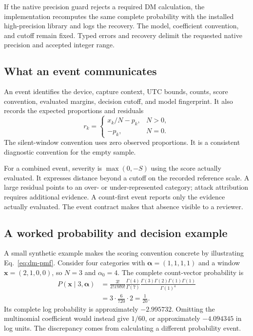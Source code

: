 If the native precision guard rejects a required DM calculation, the
implementation recomputes the same complete probability with the installed
high-precision library and logs the recovery. The model, coefficient
convention, and cutoff remain fixed. Typed errors and recovery delimit the
requested native precision and accepted integer range.

\subsection{What an event communicates}

An event identifies the device, capture context, UTC bounds, counts,
score convention, evaluated margins, decision cutoff, and model
fingerprint. It also records the expected proportions and residuals
\[
 r_k=\begin{cases}x_k/N-p_k,&N>0,\\-p_k,&N=0.\end{cases}
\]
The silent-window convention uses zero observed proportions. It is a
consistent diagnostic convention for the empty sample.

For a combined event, severity is $\max(0,-S)$ using the score actually
evaluated. It expresses distance beyond a cutoff on the recorded reference
scale. A large residual points to an over- or under-represented category;
attack attribution requires additional evidence. A count-first event
reports only the evidence actually evaluated. The event contract makes
that absence visible to a reviewer.

\subsection{A worked probability and decision example}
\label{sec:worked-score}

A small synthetic example makes the scoring convention concrete by
illustrating Eq.~\eqref{eq:dm-pmf}. Consider four categories
with $\boldsymbol{\alpha}=(1,1,1,1)$ and a window
$\boldsymbol{x}=(2,1,0,0)$, so $N=3$ and $\alpha_0=4$.
The complete count-vector probability is
\begin{align*}
 P(\boldsymbol{x}\mid3,\boldsymbol{\alpha})
 &=\frac{3!}{2!1!0!0!}
   \frac{\Gamma(4)}{\Gamma(7)}
   \frac{\Gamma(3)\Gamma(2)\Gamma(1)\Gamma(1)}{\Gamma(1)^4}\\
 &=3\cdot\frac{6}{720}\cdot2=\frac{1}{20}.
\end{align*}
Its complete log probability is approximately $-2.995732$.
Omitting the multinomial coefficient would instead give $1/60$,
or approximately $-4.094345$ in log units. The discrepancy comes from
calculating a different probability event.

